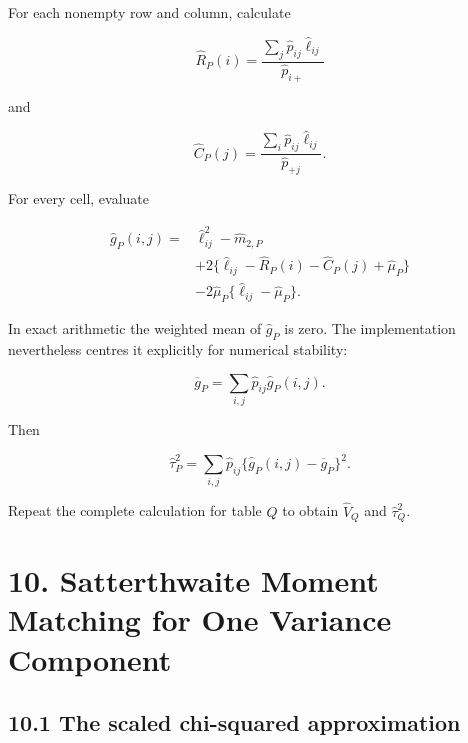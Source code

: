 \documentclass[
  11pt]{article}
\let\originalsection\section
\renewcommand{\section}{\clearpage\originalsection}
\begin{document}
For each nonempty row and column, calculate

\begin{equation}
\widehat R_P(i)
=\frac{\sum_j\widehat p_{ij}\widehat\ell_{ij}}
{\widehat p_{i+}}
\end{equation}

and

\begin{equation}
\widehat C_P(j)
=\frac{\sum_i\widehat p_{ij}\widehat\ell_{ij}}
{\widehat p_{+j}}.
\end{equation}

For every cell, evaluate

\begin{equation}
\begin{aligned}
\widehat g_P(i,j)={}&
\widehat\ell_{ij}^2-\widehat m_{2,P}\\
&+2\{\widehat\ell_{ij}-\widehat R_P(i)
-\widehat C_P(j)+\widehat\mu_P\}\\
&-2\widehat\mu_P
\{\widehat\ell_{ij}-\widehat\mu_P\}.
\end{aligned}
\end{equation}

In exact arithmetic the weighted mean of \(\widehat g_P\) is zero. The
implementation nevertheless centres it explicitly for numerical
stability:

\begin{equation}
\overline g_P
=\sum_{i,j}\widehat p_{ij}\widehat g_P(i,j).
\end{equation}

Then

\begin{equation}
\boxed{
\widehat\tau_P^2
=\sum_{i,j}\widehat p_{ij}
\{\widehat g_P(i,j)-\overline g_P\}^2.
}
\end{equation}

Repeat the complete calculation for table \(Q\) to obtain
\(\widehat V_Q\) and \(\widehat\tau_Q^2\).

\section{10. Satterthwaite Moment Matching for One Variance
Component}\label{satterthwaite-moment-matching-for-one-variance-component}

\subsection{10.1 The scaled chi-squared
approximation}\label{the-scaled-chi-squared-approximation}
\end{document}
